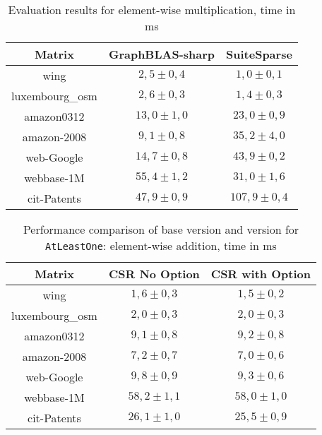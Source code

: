 \begin{table}[h]

    \centering
    \caption{Evaluation results for element-wise multiplication, time in ms}
    \label{mult-comparison}
    
    \begin{tabular}{|c||c|c|}
    \hline
    Matrix            & GraphBLAS-sharp & SuiteSparse    \\
    \hline
    \hline
    wing            & $2,5 \pm 0,4$      & $1,0 \pm 0,1$ \\
    \hline
    luxembourg\_osm & $2,6 \pm 0,3$       & $1,4 \pm 0,3$ \\
    \hline
    amazon0312      & $13,0 \pm 1,0$     & $23,0 \pm 0,9$ \\
    \hline
    amazon-2008     & $9,1 \pm 0,8$    & $35,2 \pm 4,0$ \\
    \hline
    web-Google      & $14,7 \pm 0,8$      & $43,9 \pm 0,2$  \\
    \hline
    webbase-1M      & $55,4 \pm 1,2$      & $31,0 \pm 1,6$ \\
    \hline
    cit-Patents     & $47,9 \pm 0,9$      & $107,9 \pm 0,4$  \\     
    \hline
    \end{tabular}
\end{table}

\begin{table}[h]

    \centering
    \caption{Performance comparison of base version and version for \texttt{AtLeastOne}: element-wise addition, time in ms}
    \label{option-noOption-comparison}
    
    \begin{tabular}{|c||c|c|}
    \hline
    Matrix             & CSR No Option & CSR with Option  \\
        \hline
        \hline
        wing            & $1,6 \pm 0,3$      & $1,5 \pm 0,2$ \\
        \hline
        luxembourg\_osm & $2,0 \pm 0,3$       & $2,0 \pm 0,3$ \\
        \hline
        amazon0312      & $9,1 \pm 0,8$     & $9,2 \pm 0,8$ \\
        \hline
        amazon-2008     & $7,2 \pm 0,7$    & $7,0 \pm 0,6$ \\
        \hline
        web-Google      & $9,8 \pm 0,9$      & $9,3 \pm 0,6$  \\
        \hline
        webbase-1M      & $58,2 \pm 1,1$      & $58,0 \pm 1,0$ \\
        \hline
        cit-Patents     & $26,1 \pm 1,0$      & $25,5 \pm 0,9$  \\     
        \hline
    \end{tabular}
\end{table}

